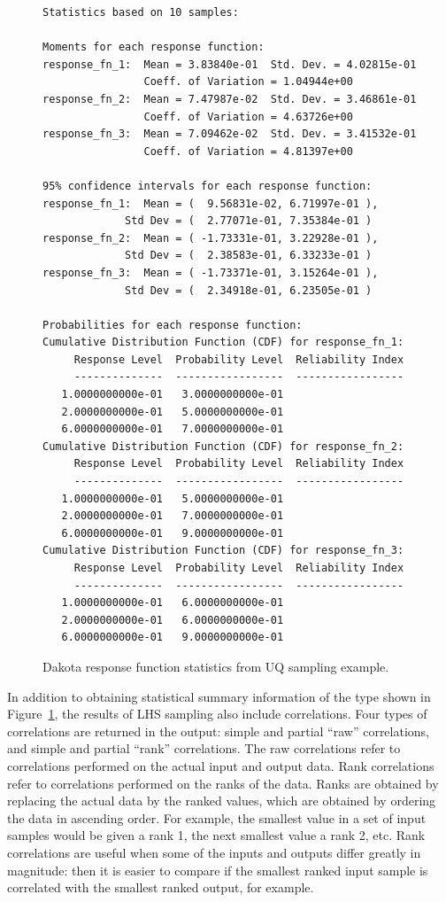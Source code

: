 \begin{figure}[htbp!]
\centering
\begin{bigbox}
\begin{small}
\begin{verbatim}
Statistics based on 10 samples:

Moments for each response function:
response_fn_1:  Mean = 3.83840e-01  Std. Dev. = 4.02815e-01
                Coeff. of Variation = 1.04944e+00
response_fn_2:  Mean = 7.47987e-02  Std. Dev. = 3.46861e-01
                Coeff. of Variation = 4.63726e+00
response_fn_3:  Mean = 7.09462e-02  Std. Dev. = 3.41532e-01
                Coeff. of Variation = 4.81397e+00

95% confidence intervals for each response function:
response_fn_1:  Mean = (  9.56831e-02, 6.71997e-01 ),
             Std Dev = (  2.77071e-01, 7.35384e-01 )
response_fn_2:  Mean = ( -1.73331e-01, 3.22928e-01 ),
             Std Dev = (  2.38583e-01, 6.33233e-01 )
response_fn_3:  Mean = ( -1.73371e-01, 3.15264e-01 ),
             Std Dev = (  2.34918e-01, 6.23505e-01 )

Probabilities for each response function:
Cumulative Distribution Function (CDF) for response_fn_1:
     Response Level  Probability Level  Reliability Index
     --------------  -----------------  -----------------
   1.0000000000e-01   3.0000000000e-01
   2.0000000000e-01   5.0000000000e-01
   6.0000000000e-01   7.0000000000e-01
Cumulative Distribution Function (CDF) for response_fn_2:
     Response Level  Probability Level  Reliability Index
     --------------  -----------------  -----------------
   1.0000000000e-01   5.0000000000e-01
   2.0000000000e-01   7.0000000000e-01
   6.0000000000e-01   9.0000000000e-01
Cumulative Distribution Function (CDF) for response_fn_3:
     Response Level  Probability Level  Reliability Index
     --------------  -----------------  -----------------
   1.0000000000e-01   6.0000000000e-01
   2.0000000000e-01   6.0000000000e-01
   6.0000000000e-01   9.0000000000e-01
\end{verbatim}
\end{small}
\end{bigbox}
\caption{Dakota response function statistics from UQ sampling example.}
\label{uq:figure03}
\end{figure}

In addition to obtaining statistical summary information of the type
shown in Figure~\ref{uq:figure03}, the results of LHS sampling also
include correlations. Four types of correlations are returned in the
output: simple and partial ``raw'' correlations, and simple and
partial ``rank'' correlations. The raw correlations refer to
correlations performed on the actual input and output data. Rank
correlations refer to correlations performed on the ranks of the data.
Ranks are obtained by replacing the actual data by the ranked values,
which are obtained by ordering the data in ascending order. For
example, the smallest value in a set of input samples would be given a
rank 1, the next smallest value a rank 2, etc. Rank correlations are
useful when some of the inputs and outputs differ greatly in
magnitude: then it is easier to compare if the smallest ranked input
sample is correlated with the smallest ranked output, for example.

